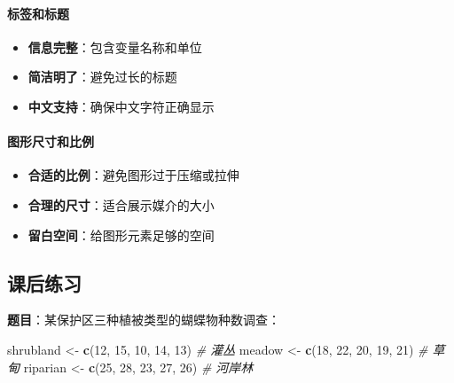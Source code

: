 \documentclass[
  twoside]{book}
\newenvironment{Shaded}{\begin{snugshade}}{\end{snugshade}}
\newcommand{\CommentTok}[1]{\textcolor[rgb]{0.56,0.35,0.01}{\textit{#1}}}
\newcommand{\DecValTok}[1]{\textcolor[rgb]{0.00,0.00,0.81}{#1}}
\newcommand{\FunctionTok}[1]{\textcolor[rgb]{0.13,0.29,0.53}{\textbf{#1}}}
\newcommand{\NormalTok}[1]{#1}
\newcommand{\OtherTok}[1]{\textcolor[rgb]{0.56,0.35,0.01}{#1}}
\providecommand{\tightlist}{%
  \setlength{\itemsep}{0pt}\setlength{\parskip}{0pt}}
\begin{document}
\hypertarget{ux6807ux7b7eux548cux6807ux9898}{%
\paragraph{标签和标题}\label{ux6807ux7b7eux548cux6807ux9898}}

\begin{itemize}
\tightlist
\item
  \textbf{信息完整}：包含变量名称和单位
\item
  \textbf{简洁明了}：避免过长的标题
\item
  \textbf{中文支持}：确保中文字符正确显示
\end{itemize}

\hypertarget{ux56feux5f62ux5c3aux5bf8ux548cux6bd4ux4f8b}{%
\paragraph{图形尺寸和比例}\label{ux56feux5f62ux5c3aux5bf8ux548cux6bd4ux4f8b}}

\begin{itemize}
\tightlist
\item
  \textbf{合适的比例}：避免图形过于压缩或拉伸
\item
  \textbf{合理的尺寸}：适合展示媒介的大小
\item
  \textbf{留白空间}：给图形元素足够的空间
\end{itemize}

\hypertarget{ux8bfeux540eux7ec3ux4e60-6}{%
\subsection{课后练习}\label{ux8bfeux540eux7ec3ux4e60-6}}

\textbf{题目}：某保护区三种植被类型的蝴蝶物种数调查：

\begin{Shaded}
\begin{Highlighting}[]
\NormalTok{shrubland }\OtherTok{\textless{}{-}} \FunctionTok{c}\NormalTok{(}\DecValTok{12}\NormalTok{, }\DecValTok{15}\NormalTok{, }\DecValTok{10}\NormalTok{, }\DecValTok{14}\NormalTok{, }\DecValTok{13}\NormalTok{)    }\CommentTok{\# 灌丛}
\NormalTok{meadow }\OtherTok{\textless{}{-}} \FunctionTok{c}\NormalTok{(}\DecValTok{18}\NormalTok{, }\DecValTok{22}\NormalTok{, }\DecValTok{20}\NormalTok{, }\DecValTok{19}\NormalTok{, }\DecValTok{21}\NormalTok{)       }\CommentTok{\# 草甸}
\NormalTok{riparian }\OtherTok{\textless{}{-}} \FunctionTok{c}\NormalTok{(}\DecValTok{25}\NormalTok{, }\DecValTok{28}\NormalTok{, }\DecValTok{23}\NormalTok{, }\DecValTok{27}\NormalTok{, }\DecValTok{26}\NormalTok{)     }\CommentTok{\# 河岸林}
\end{Highlighting}
\end{Shaded}
\end{document}
